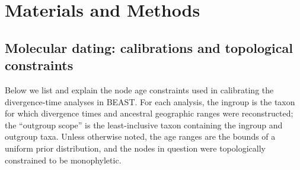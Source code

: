 \documentclass[10pt]{article}
\begin{document}
\raggedright
\parindent 0.5in



\clearpage
\newpage

\section*{Materials and Methods}

\subsection*{Molecular dating: calibrations and topological constraints}






Below we list and explain the node age constraints used in calibrating
the divergence-time analyses in BEAST. For each analysis, the ingroup
is the taxon for which divergence times and ancestral geographic
ranges were reconstructed; the ``outgroup scope'' is the
least-inclusive taxon containing the ingroup and outgroup taxa. Unless
otherwise noted, the age ranges are the bounds of a uniform prior
distribution, and the nodes in question were topologically constrained
to be monophyletic.
\end{document}
